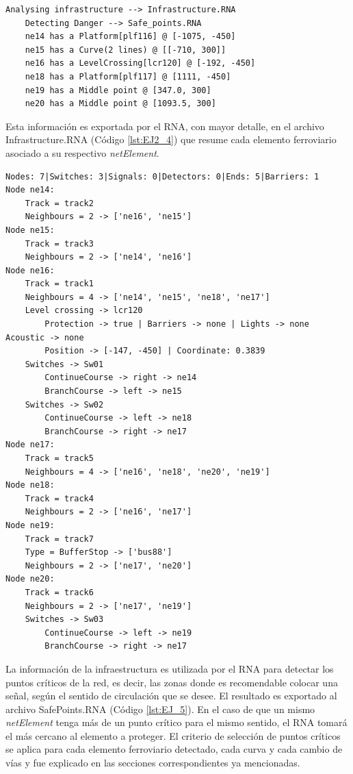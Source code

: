 	\begin{lstlisting}[language = {}, caption = Detección de puntos críticos por parte del RNA , label = {lst:EJ2_2}]
	Analysing infrastructure --> Infrastructure.RNA
	Detecting Danger --> Safe_points.RNA
	ne14 has a Platform[plf116] @ [-1075, -450]
	ne15 has a Curve(2 lines) @ [[-710, 300]]
	ne16 has a LevelCrossing[lcr120] @ [-192, -450]
	ne18 has a Platform[plf117] @ [1111, -450]
	ne19 has a Middle point @ [347.0, 300]
	ne20 has a Middle point @ [1093.5, 300]
	\end{lstlisting}

	Esta información es exportada por el RNA, con mayor detalle, en el archivo Infrastructure.RNA (Código \ref{lst:EJ2_4}) que resume cada elemento ferroviario asociado a su respectivo \textit{netElement}.
	
	\begin{lstlisting}[language = {}, caption = Infrastructure.RNA, label = {lst:EJ2_4}]
Nodes: 7|Switches: 3|Signals: 0|Detectors: 0|Ends: 5|Barriers: 1
Node ne14:
	Track = track2
	Neighbours = 2 -> ['ne16', 'ne15']
Node ne15:
	Track = track3
	Neighbours = 2 -> ['ne14', 'ne16']
Node ne16:
	Track = track1
	Neighbours = 4 -> ['ne14', 'ne15', 'ne18', 'ne17']
	Level crossing -> lcr120
		Protection -> true | Barriers -> none | Lights -> none Acoustic -> none
		Position -> [-147, -450] | Coordinate: 0.3839
	Switches -> Sw01
		ContinueCourse -> right -> ne14
		BranchCourse -> left -> ne15
	Switches -> Sw02
		ContinueCourse -> left -> ne18
		BranchCourse -> right -> ne17
Node ne17:
	Track = track5
	Neighbours = 4 -> ['ne16', 'ne18', 'ne20', 'ne19']
Node ne18:
	Track = track4
	Neighbours = 2 -> ['ne16', 'ne17']
Node ne19:
	Track = track7
	Type = BufferStop -> ['bus88']
	Neighbours = 2 -> ['ne17', 'ne20']
Node ne20:
	Track = track6
	Neighbours = 2 -> ['ne17', 'ne19']
	Switches -> Sw03
		ContinueCourse -> left -> ne19
		BranchCourse -> right -> ne17
	\end{lstlisting}
	
	La información de la infraestructura es utilizada por el RNA para detectar los puntos críticos de la red, es decir, las zonas donde es recomendable colocar una señal, según el sentido de circulación que se desee. El resultado es exportado al archivo SafePoints.RNA (Código \ref{lst:EJ_5}). En el caso de que un mismo \textit{netElement} tenga más de un punto crítico para el mismo sentido, el RNA tomará el más cercano al elemento a proteger. El criterio de selección de puntos críticos se aplica para cada elemento ferroviario detectado, cada curva y cada cambio de vías y fue explicado en las secciones correspondientes ya mencionadas.
	
